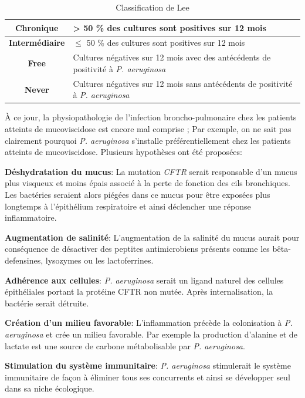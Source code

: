 \documentclass[12pt,a4paper]{article}
\begin{document}
 \begin{table}[h]
     \centering
     \caption{Classification de Lee \cite{Lee2003}}
     \begin{tabular}{|c|p{10cm}|}
      \hline
          \textbf{Chronique} & > 50 \% des cultures sont positives sur 12 mois \\
         \hline
         \textbf{Intermédiaire} & $\leq$ 50 \% des cultures sont positives sur  12 mois\\
          \hline
          \textbf{Free} & Cultures négatives sur 12 mois avec des antécédents de positivité à \textit{P. aeruginosa}\\
         \hline
	    \textbf{Never} & Cultures négatives sur 12 mois sans antécédents de positivité à \textit{P. aeruginosa} \\
	      \hline
     \end{tabular}
     \label{lee}
 \end{table}


À ce jour, la physiopathologie de l'infection broncho-pulmonaire chez les patients atteints de mucoviscidose est encore mal comprise ; Par exemple, on ne sait pas clairement pourquoi \textit{P. aeruginosa} s’installe préférentiellement chez les patients atteints de mucoviscidose. Plusieurs hypothèses ont été proposées:

\textbf{Déshydratation du mucus}\cite{Davies}:
La mutation \textit{CFTR} serait responsable d'un mucus plus visqueux et moins épais associé à la perte de fonction des cils bronchiques. Les bactéries seraient alors piégées dans ce mucus pour être exposées plus longtemps à l'épithélium respiratoire et ainsi déclencher une réponse inflammatoire.

\textbf{Augmentation de salinité}\cite{Davies}:
L'augmentation de la salinité du mucus aurait pour conséquence de désactiver des peptites antimicrobiens présents comme les bêta-defensines, lysozymes ou les lactoferrines.

\textbf{Adhérence aux cellules}\cite{Davies}:
\textit{P. aeruginosa} serait un ligand naturel des cellules épithéliales portant la protéine CFTR non mutée. Après internalisation, la bactérie serait détruite.

\textbf{Création d'un milieu favorable}:
L'inflammation précède la colonisation à \textit{P. aeruginosa} et crée un milieu favorable.
Par exemple la production d'alanine et de lactate \cite{Boulette2009} est une source de carbone métabolisable par \textit{P. aeruginosa}.

\textbf{Stimulation du système immunitaire}:
\textit{P. aeruginosa} stimulerait le système immunitaire de façon à éliminer tous ses concurrents et ainsi se développer seul dans sa niche écologique\cite{Pernet2015}.
\end{document}
